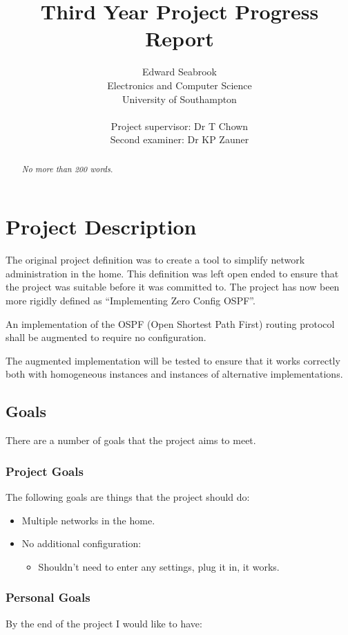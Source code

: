 \documentclass[12pt]{report}
\author{Edward Seabrook \\ 
Electronics and Computer Science \\ 
University of Southampton \\ \\
Project supervisor: Dr T Chown \\
Second examiner: Dr KP Zauner}
\title{Third Year Project Progress Report}
\begin{document}



\begin{abstract}
\em No more than 200 words. \em


\end{abstract}

\tableofcontents

\chapter{Project Description}

The original project definition was to create a tool to simplify network administration in the home.
This definition was left open ended to ensure that the project was suitable before it was committed to.
The project has now been more rigidly defined as ``Implementing Zero Config OSPF''.

An implementation of the OSPF (Open Shortest Path First) routing protocol shall be augmented to 
require no configuration.

The augmented implementation will be tested to ensure that it works correctly both with homogeneous 
instances and instances of alternative implementations. 

\section{Goals}

There are a number of goals that the project aims to meet.

\subsection{Project Goals }
The following goals are things that the project should do:

\begin{itemize}

	\item Multiple networks in the home. 

	\item No additional configuration:

		\begin{itemize}	
  		\item Shouldn't need to enter any settings, plug it in, it works. 
		\end{itemize}
\end{itemize}

\subsection{Personal Goals}
By the end of the project I would like to have:
\end{document}
